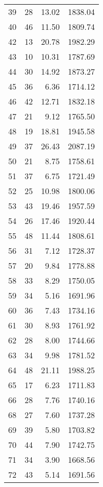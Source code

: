 \begin{appendix}
\begin{longtable}{rrrr}
39 & 28 & 13.02 & 1838.04 \\
40 & 46 & 11.50 & 1809.74 \\
42 & 13 & 20.78 & 1982.29 \\
43 & 10 & 10.31 & 1787.69 \\
44 & 30 & 14.92 & 1873.27 \\
45 & 36 & 6.36 & 1714.12 \\
46 & 42 & 12.71 & 1832.18 \\
47 & 21 & 9.12 & 1765.50 \\
48 & 19 & 18.81 & 1945.58 \\
49 & 37 & 26.43 & 2087.19 \\
50 & 21 & 8.75 & 1758.61 \\
51 & 37 & 6.75 & 1721.49 \\
52 & 25 & 10.98 & 1800.06 \\
53 & 43 & 19.46 & 1957.59 \\
54 & 26 & 17.46 & 1920.44 \\
55 & 48 & 11.44 & 1808.61 \\
56 & 31 & 7.12 & 1728.37 \\
57 & 20 & 9.84 & 1778.88 \\
58 & 33 & 8.29 & 1750.05 \\
59 & 34 & 5.16 & 1691.96 \\
60 & 36 & 7.43 & 1734.16 \\
61 & 30 & 8.93 & 1761.92 \\
62 & 28 & 8.00 & 1744.66 \\
63 & 34 & 9.98 & 1781.52 \\
64 & 48 & 21.11 & 1988.25 \\
65 & 17 & 6.23 & 1711.83 \\
66 & 28 & 7.76 & 1740.16 \\
68 & 27 & 7.60 & 1737.28 \\
69 & 39 & 5.80 & 1703.82 \\
70 & 44 & 7.90 & 1742.75 \\
71 & 34 & 3.90 & 1668.56 \\
72 & 43 & 5.14 & 1691.56 \\
\bottomrule
\end{longtable}


\end{appendix}
